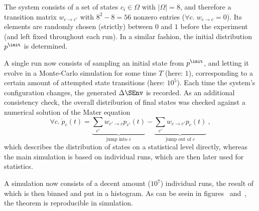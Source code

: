 The system consists of a set of states \(c_i\in\Omega\) with \(|\Omega| = 8\), and therefore a transition matrix \(w_{c\to c'}\) with \(8^2-8 = 56\) nonzero entries (\(\forall c.\;w_{c\to c} = 0\)). Its elements are randomly chosen (strictly) between \(0\) and \(1\) before the experiment (and left fixed throughout each run). In a similar fashion, the initial distribution \(p^\init\) is determined.

A single run now consists of sampling an initial state from \(p^\init\), and letting it evolve in a Monte-Carlo simulation for some time \(T\) (here: \(1\)), corresponding to a certain amount of attempted state transitions (here: \(10^5\)). Each time the system's configuration changes, the generated \(\Delta\SEnv\) is recorded. As an additional consistency check, the overall distriburion of final states was checked against a numerical solution of the Mater equation
%
\begin{equation}
	\forall c.\;\dot p_c(t) = \underbrace{\sum_{c'}w_{c'\to c}p_{c'}(t)}_{\text{jump into } c} - \underbrace{\sum_{c'} w_{c\to c'}p_{c}(t)}_{\text{jump out of } c} ~,
\end{equation}
%
which describes the distribution of states on a statistical level directly, whereas the main simulation is based on individual runs, which are then later used for statistics.


A simulation now consists of a decent amount (\(10^7\)) individual runs, the result of which is then binned and put in a histogram. As can be seein in figures ~and~, the theorem is reproducible in simulation.


